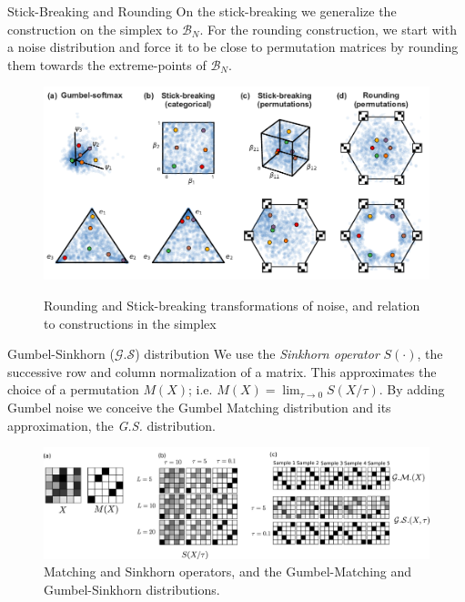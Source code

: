 \documentclass[final]{beamer}
\begin{document}
\begin{frame}[allowframebreaks]
\begin{minipage}[htp][1\textheight][t]{\textwidth}
\begin{columns}[t]
\begin{column}{.5\linewidth}
	              
	  
	    \begin{block}{Stick-Breaking and Rounding}
	    \large
	    On the stick-breaking we generalize the construction on the simplex \cite{linderman2015dependent} to
$\mathcal{B}_N$. For the
rounding construction, we start with a noise distribution and force it
to be close to permutation matrices by rounding them towards the
extreme-points of $\mathcal{B}_N$.
           	 \begin{figure}
	    	\centering
		{\includegraphics[width=1.0\textwidth]{figs/Figure1.pdf}}
		 \caption{\normalsize Rounding and Stick-breaking transformations of noise, and relation to constructions in the simplex }
\label{fig:transforms}
	\end{figure}


	  
\end{block}
	
	     
	\begin{block}{Gumbel-Sinkhorn ($\mathcal{G.S}$) distribution}
	\large
We use the \emph{Sinkhorn operator} $S(\cdot)$, the successive row and
column normalization of a matrix. This approximates the choice of a permutation $M(X)$; i.e. $M(X)=\lim_{\tau\rightarrow 0} S(X/\tau)$. By adding Gumbel noise we conceive the Gumbel Matching distribution and its approximation, the  \emph{G.S.} distribution.
			\begin{figure}
         \includegraphics[trim = 0cm 0cm 0mm 0.0cm, clip=true, width=1.0\textwidth]{figs/Figure2.pdf}
	 \caption{\normalsize Matching and Sinkhorn operators, and the Gumbel-Matching and Gumbel-Sinkhorn distributions.}
 \label{fig:figure2}
 \end{figure} 
            \end{block}	
             


\end{column}
\end{columns}
\end{minipage}
\end{frame}
\end{document}

